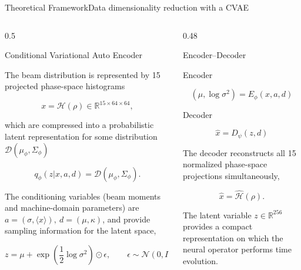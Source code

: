 \documentclass[aspectratio=169,t,11pt,table]{beamer}
{\setbeamercovered{transparent}}
\begin{document}
\begin{frame}{Theoretical Framework}{Data dimensionality reduction with a CVAE}
\vspace{-0.7cm}

\begin{columns}[T]

\begin{column}{0.5\textwidth}

\begin{purpleBlock}{\centering\small{Conditional Variational Auto Encoder}}

\tiny

The beam distribution is represented by 15 projected phase-space histograms

\[
x=\mathcal H(\rho)\in\mathbb R^{15\times64\times64},
\]

which are compressed into a probabilistic latent representation for some distribution $ \mathcal D(\mu_\phi,\Sigma_\phi)$

\[
q_\phi(z|x,a,d)
=
\mathcal D(\mu_\phi,\Sigma_\phi).
\]

The conditioning variables (beam moments and machine-domain parameters) are $ a=(\sigma,\langle x\rangle),\ d=(\mu,\kappa)$,
and provide sampling information for the latent space, 

\[
z=\mu+\exp\!\left(\frac12\log\sigma^2\right)\odot\epsilon,
\qquad
\epsilon\sim\mathcal N(0,I),
\]


\end{purpleBlock}

\end{column}

\hfill

\begin{column}{0.48\textwidth}

\begin{purpleBlock}{\centering\small{Encoder--Decoder}}

\tiny

Encoder

\[
(\mu,\log\sigma^2)
=
E_\phi(x,a,d)
\]

Decoder

\[
\hat x=D_\psi(z,d)
\]

The decoder reconstructs all 15 normalized phase-space projections simultaneously,

\[
\hat x
=
\widehat{\mathcal H}(\rho).
\]

The latent variable $ z\in\mathbb R^{256}$ provides a compact representation on which the neural operator performs time evolution.

\end{purpleBlock}

\end{column}

\end{columns}

\end{frame}
\end{document}
